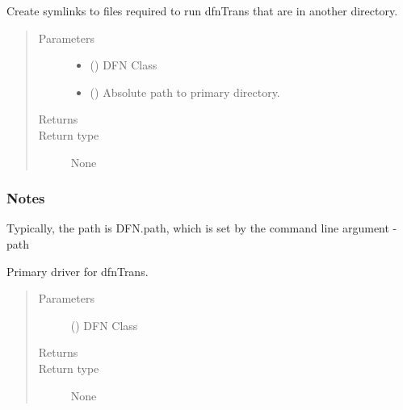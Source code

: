 \documentclass[letterpaper,10pt,english]{sphinxmanual}
\begin{document}
\begin{fulllineitems}
\label{\detokenize{pydfnworks:pydfnworks.dfnTrans.transport.create_dfn_trans_links}}
Create symlinks to files required to run dfnTrans that are in another directory.
\begin{quote}\begin{description}
\item[{Parameters}] \leavevmode\begin{itemize}
\item {} 
 () \textendash{} DFN Class

\item {} 
 () \textendash{} Absolute path to primary directory.

\end{itemize}

\item[{Returns}] \leavevmode


\item[{Return type}] \leavevmode
None

\end{description}\end{quote}
\subsubsection*{Notes}

Typically, the path is DFN.path, which is set by the command line argument -path

\end{fulllineitems}


\begin{fulllineitems}
\label{\detokenize{pydfnworks:pydfnworks.dfnTrans.transport.dfn_trans}}
Primary driver for dfnTrans.
\begin{quote}\begin{description}
\item[{Parameters}] \leavevmode
{} () \textendash{} DFN Class

\item[{Returns}] \leavevmode


\item[{Return type}] \leavevmode
None

\end{description}\end{quote}

\end{fulllineitems}
\end{document}
